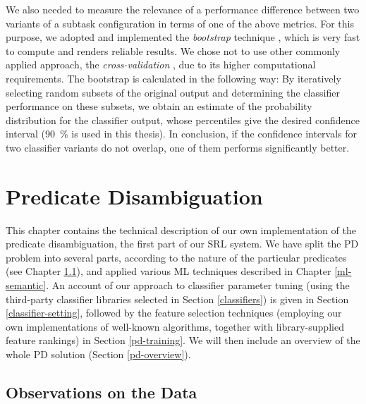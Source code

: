 \documentclass[12pt,notitlepage,a4paper]{report}
\begin{document}
We also needed to measure the relevance of a performance difference between two variants of a subtask configuration in terms of one of the above metrics. For this purpose, we adopted and implemented the \emph{bootstrap} technique \citep[p.~152]{efron79,witten05}, which is very fast to compute and renders reliable results. We chose not to use other commonly applied approach, the \emph{cross-validation} \citep[p.~241ff.]{hastie09}, due to its higher computational requirements.
The bootstrap is calculated in the following way: By iteratively selecting random subsets of the original output and determining the classifier performance on these subsets, we obtain an estimate of the probability distribution for the classifier output, whose percentiles give the desired confidence interval (90~\% is used in this thesis). In conclusion, if the confidence intervals for two classifier variants do not overlap, one of them performs significantly better.

%
%
\chapter{Predicate Disambiguation}\label{pd}
%
%

This chapter contains the technical description of our own implementation of the predicate disambiguation, the first part of our SRL system. We have split the PD problem into several parts, according to the nature of the particular predicates (see Chapter \ref{pd-observe}), and applied various ML techniques described in Chapter \ref{ml-semantic}. An account of our approach to classifier parameter tuning (using the third-party classifier libraries selected in Section \ref{classifiers}) is given in Section \ref{classifier-setting}, followed by the feature selection techniques (employing our own implementations of well-known algorithms, together with library-supplied feature rankings) in Section \ref{pd-training}. We will then include an overview of the whole PD solution (Section \ref{pd-overview}).

\section{Observations on the Data}\label{pd-observe}
\end{document}
